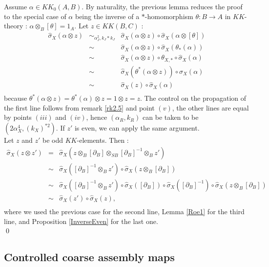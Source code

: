 \begin{dem}
Assume $\alpha\in KK_0(A,B)$. By naturality, the previous lemma reduces the proof to the special case of $\alpha$ being the inverse of a $*$-homomorphism $\theta : B\rightarrow A$ in $KK$-theory : $\alpha\otimes_B [\theta]=1_A$. Let $z\in KK(B,C)$ :
\[\begin{array}{rcl}
\hat\sigma_X (\alpha\otimes z) & \sim_{\alpha_J^2,k_J*k_J} &  \hat\sigma_X (\alpha\otimes z)\circ \hat\sigma_X (\alpha\otimes [\theta]) \\
			& \sim & \hat\sigma_X (\alpha\otimes z)\circ \hat\sigma_X (\theta_*(\alpha))\\
			& \sim & \hat\sigma_X (\alpha\otimes z)\circ \theta_{X,*}\circ \hat\sigma_X (\alpha)\\
			& \sim & \hat\sigma_X (\theta^*(\alpha\otimes z))\circ \hat\sigma_X (\alpha)\\
			& \sim & \hat\sigma_X (z)\circ \hat\sigma_X (\alpha) \\
\end{array}\] 
because $\theta^*(\alpha\otimes z)=\theta^*(\alpha)\otimes z=1\otimes z =z$. The control on the propagation of the first line follows from remark \ref{rk2.5} and point $(v)$, the other lines are equal by points $(iii)$ and $(iv)$, hence $(\alpha_R,k_R)$ can be taken to be $(2 \alpha_X^{4},( k_X)^{*2})$. If $z'$ is even, we can apply the same argument.\\

Let $z$ and $z'$ be odd $KK$-elements. Then :
\[\begin{array}{rcl}
\hat\sigma_X (z\otimes z') & = &  \hat\sigma_X (z\otimes_B [\partial_{B}]\otimes_{SB} [\partial_B]^{-1}\otimes_B z') \\
			& \sim & \hat\sigma_X ( [\partial_B]^{-1}\otimes_B z')\circ \hat\sigma_X (z\otimes_B [\partial_{B}])\\
			& \sim & \hat\sigma_X ( [\partial_B]^{-1}\otimes_B z')\circ \hat\sigma_X ( [\partial_B])\circ\hat\sigma_X( [\partial_B]^{-1})\circ \hat\sigma_X (z\otimes_B [\partial_{B}])\\		
			& \sim & \hat\sigma_X (  z')\circ \hat\sigma_X (z),\\
\end{array}\] 
where we used the previous case for the second line, Lemma \ref{Roe1} for the third line, and Proposition \ref{InverseEven} for the last one.\\
\qed
\end{dem}

\subsection{Controlled coarse assembly maps}

